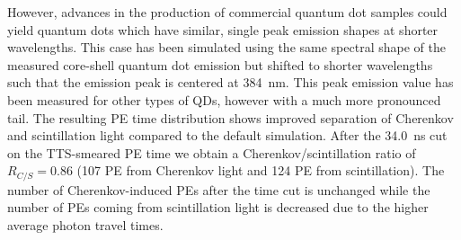 \documentclass[cits]{JINST}
\begin{document}
However, advances in the production of commercial quantum dot samples
could yield quantum dots which have similar, single peak emission
shapes at shorter wavelengths. This case has been simulated using the
same spectral shape of the measured core-shell quantum dot emission
but shifted to shorter wavelengths such that the emission peak is
centered at 384~nm. This peak emission value has been measured for
other types of QDs, however with a much more pronounced 
tail\cite{qdot2}. The resulting PE time distribution shows improved
separation of Cherenkov and scintillation light compared to the
default simulation. After the 34.0~ns cut on the TTS-smeared PE time
we obtain a Cherenkov/scintillation ratio of $R_{C/S}=0.86$ (107 PE
from Cherenkov light and 124 PE from scintillation). The number of
Cherenkov-induced PEs after the time cut is unchanged while the number
of PEs coming from scintillation light is decreased due to the higher
average photon travel times.
\end{document}
